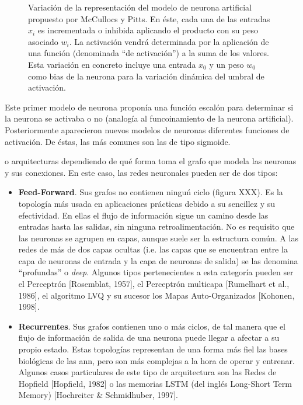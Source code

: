 \begin{figure}
	\caption{Variación de la representación del modelo de neurona artificial propuesto por McCullocs y Pitts. En éste, cada una de las entradas $x_i$ es incrementada o inhibida aplicando el producto con su peso asociado $w_i$. La activación vendrá determinada por la aplicación de una función (denominada \enquote{de activación}) a la suma de los valores. Esta variación en concreto incluye una entrada $x_0$ y un peso $w_0$ como bias de la neurona para la variación dinámica del umbral de activación.}
	\label{fig:mccullocs-pitts-neuron-model}
\end{figure}

Este primer modelo de neurona proponía una función escalón para determinar si la neurona se activaba o no (analogía al funcoinamiento de la neurona artificial). Posteriormente aparecieron nuevos modelos de neuronas diferentes funciones de activación. De éstas, las más comunes son las de tipo sigmoide.


 o arquitecturas dependiendo de qué forma toma el grafo que modela las neuronas y sus conexiones. En este caso, las redes neuronales pueden ser de dos tipos:

\begin{itemize}
	\item \textbf{Feed-Forward}. Sus grafos no contienen ninguń ciclo (figura XXX). Es la topología más usada en aplicaciones prácticas debido a su sencillez y su efectividad. En ellas el flujo de información sigue un camino desde las entradas hasta las salidas, sin ninguna retroalimentación. No es requisito que las neuronas se agrupen en capas, aunque suele ser la estructura común. A las redes de más de dos capas ocultas (i.e. las capas que se encuentran entre la capa de neuronas de entrada y la capa de neuronas de salida) se las denomina \enquote{profundas} o \textit{deep}. Algunos tipos pertenecientes a esta categoría pueden ser el Perceptrón [Rosemblat, 1957], el Perceptrón multicapa [Rumelhart et al., 1986], el algoritmo LVQ y su sucesor los Mapas Auto-Organizados [Kohonen, 1998].
	\item \textbf{Recurrentes}. Sus grafos contienen uno o más ciclos, de tal manera que el flujo de información de salida de una neurona puede llegar a afectar a su propio estado. Estas topologías representan de una forma más fiel las bases biológicas de las \ac{ann}, pero son más complejas a la hora de operar y entrenar. Algunos casos particulares de este tipo de arquitectura son las Redes de Hopfield [Hopfield, 1982] o las memorias LSTM (del inglés Long-Short Term Memory) [Hochreiter \& Schmidhuber, 1997].
\end{itemize}

